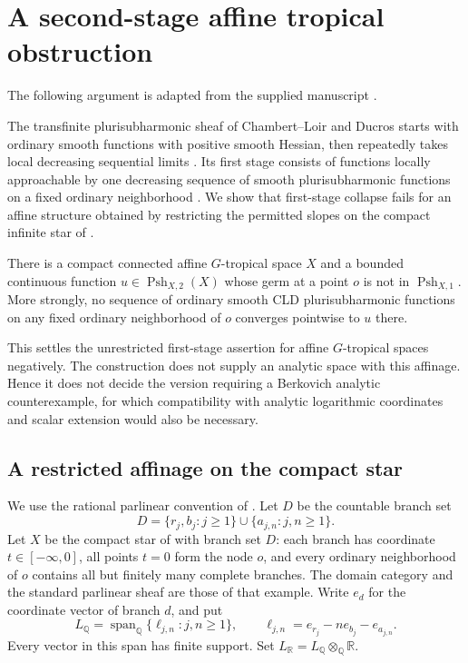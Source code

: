 \section{A second-stage affine tropical obstruction}
\label{sec:supplied-p071b}

The following argument is adapted from the supplied manuscript
\cite{SuppliedP071Star20260924}.


The transfinite plurisubharmonic sheaf of Chambert--Loir and Ducros starts with ordinary smooth functions with positive smooth Hessian, then repeatedly takes local decreasing sequential limits \cite[Definition~8.1.1 and Lemma~8.1.4]{CLD25}. Its first stage consists of functions locally approachable by one decreasing sequence of smooth plurisubharmonic functions on a fixed ordinary neighborhood \cite[Definition~8.1.13]{CLD25}. We show that first-stage collapse fails for an affine structure obtained by restricting the permitted slopes on the compact infinite star of \cite[\S6.7.3]{CLD25}.

\begin{theorem}\label{thm:supplied-p071b-second-stage-star}
There is a compact connected affine $G$-tropical space $X$ and a bounded continuous function $u\in\operatorname{Psh}_{X,2}(X)$ whose germ at a point $o$ is not in $\operatorname{Psh}_{X,1}$. More strongly, no sequence of ordinary smooth CLD plurisubharmonic functions on any fixed ordinary neighborhood of $o$ converges pointwise to $u$ there.
\end{theorem}

This settles the unrestricted first-stage assertion for affine $G$-tropical spaces negatively. The construction does not supply an analytic space with this affinage. Hence it does not decide the version requiring a Berkovich analytic counterexample, for which compatibility with analytic logarithmic coordinates and scalar extension would also be necessary.

\subsection{A restricted affinage on the compact star}\label{sec:supplied-p071b-affinage}

We use the rational parlinear convention of \cite[\S\S1.8.2 and~1.8.8]{CLD25}. Let $D$ be the countable branch set
\[
 D=\{r_j,b_j:j\geq1\}\cup\{a_{j,n}:j,n\geq1\}.
\]
Let $X$ be the compact star of \cite[\S6.7.3]{CLD25} with branch set $D$: each branch has coordinate $t\in[-\infty,0]$, all points $t=0$ form the node $o$, and every ordinary neighborhood of $o$ contains all but finitely many complete branches. The domain category and the standard parlinear sheaf are those of that example. Write $e_d$ for the coordinate vector of branch $d$, and put
\begin{equation}\label{eq:supplied-p071b-slope-space}
 L_{\mathbb Q}=\operatorname{span}_{\mathbb Q}\{\ell_{j,n}:j,n\geq1\},\qquad
 \ell_{j,n}=e_{r_j}-n e_{b_j}-e_{a_{j,n}}.
\end{equation}
Every vector in this span has finite support. Set $L_{\mathbb R}=L_{\mathbb Q}\otimes_{\mathbb Q}\mathbb R$.

